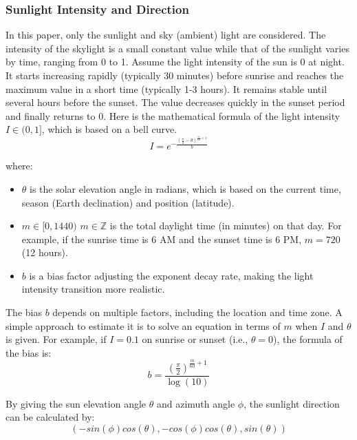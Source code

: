 \documentclass{article}
\begin{document}
\subsubsection {Sunlight Intensity and Direction}
In this paper, only the sunlight and sky (ambient) light are considered. The intensity of the skylight is a small constant value 
while that of the sunlight varies by time, ranging from 0 to 1. Assume the light intensity of the sun is 0 at night. It starts 
increasing rapidly (typically 30 minutes) before sunrise and reaches the maximum value in a short time (typically 1-3 hours). It 
remains stable until several hours before the sunset. The value decreases quickly in the sunset period and finally returns to 0. Here 
is the mathematical formula of the light intensity \( I \in (0, 1]\), which is based on a bell curve.
\[
  I = e^{-\frac{\left(\frac{\pi}{2} - \theta\right)^{\frac{m}{60} + 1}}{b}}
\]

where:
\begin{itemize}
  \item \( \theta \) is the solar elevation angle in radians, which is based on the current time, season (Earth declination) and 
  position (latitude).
  \item \( m \in [0, 1440)\) \( m \in \mathbb{Z} \) is the total daylight time (in minutes) on that day. For example, if the sunrise 
  time is 6 AM and the sunset time is 6 PM, \( m=720 \) (12 hours).
  \item \( b \) is a bias factor adjusting the exponent decay rate, making the light intensity transition more realistic.
\end{itemize}

The bias \( b \) depends on multiple factors, including the location and time zone. A simple approach to estimate it is to solve an 
equation in terms of \( m \) when \( I \) and \( \theta\) is given. For example, if \( I=0.1 \) on sunrise or sunset (i.e., 
\( \theta=0\)), the formula of the bias is:
\[
  b = \frac{\left(\frac{\pi}{2}\right)^{\frac{m}{60} + 1}}{\log(10)}
\]

By giving the sun elevation angle \( \theta \) and azimuth angle \( \phi \), the sunlight direction can be calculated by:
\[
  (-sin(\phi)cos(\theta), -cos(\phi)cos(\theta), sin(\theta))
\]

\end{document}
